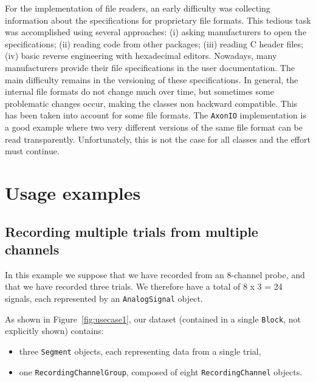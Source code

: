 \documentclass{frontiers}
\begin{document}
For the implementation of file readers, an early difficulty was collecting information about the specifications for proprietary file formats. This tedious task was accomplished using several approaches: (i) asking manufacturers to open the specifications; (ii) reading code from other packages; (iii) reading C header files; (iv) basic reverse engineering with hexadecimal editors. Nowadays, many manufacturers provide their file specifications in the user documentation.
The main difficulty remains in the versioning of these specifications. In general, the internal file formats do not change much over time, but sometimes some problematic changes occur, making the classes non backward compatible. This has been taken into account for some file formats. The \lstinline`AxonIO` implementation is a good example where two very different versions of the same file format can be read transparently. Unfortunately, this is not the case for all classes and the effort must continue.



\section{Usage examples}

\subsection{Recording multiple trials from multiple channels}


In this example we suppose that we have recorded from an 8-channel probe, and that we have recorded three trials. We therefore have a total of 8 x 3 = 24 signals, each represented by an \lstinline`AnalogSignal` object.

As shown in Figure~\ref{fig:usecase1}, our dataset (contained in a single \lstinline`Block`, not explicitly shown) contains:
\begin{itemize}
\item three \lstinline`Segment` objects, each representing data from a single trial,
\item one \lstinline`RecordingChannelGroup`, composed of eight \lstinline`RecordingChannel` objects.
\end{itemize}
\end{document}

